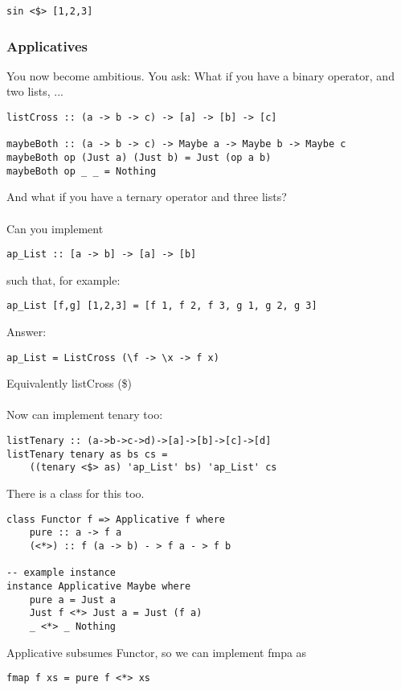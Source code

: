 \documentclass[12pt]{article}
\begin{document}
\begin{lstlisting}
sin <$> [1,2,3]
\end{lstlisting}

\subsubsection{Applicatives}

You now become ambitious. You ask: What if you have a binary operator, and two lists, ...

\begin{lstlisting}
listCross :: (a -> b -> c) -> [a] -> [b] -> [c]

maybeBoth :: (a -> b -> c) -> Maybe a -> Maybe b -> Maybe c
maybeBoth op (Just a) (Just b) = Just (op a b)
maybeBoth op _ _ = Nothing
\end{lstlisting}

And what if you have a ternary operator and three lists?\\
\\
Can you implement
\begin{lstlisting}
ap_List :: [a -> b] -> [a] -> [b]
\end{lstlisting}

such that, for example:

\begin{lstlisting}
ap_List [f,g] [1,2,3] = [f 1, f 2, f 3, g 1, g 2, g 3]
\end{lstlisting}

Answer:
\begin{lstlisting}
ap_List = ListCross (\f -> \x -> f x)
\end{lstlisting}
Equivalently listCross (\$)\\
\\
Now can implement tenary too:

\begin{lstlisting}
listTenary :: (a->b->c->d)->[a]->[b]->[c]->[d]
listTenary tenary as bs cs = 
	((tenary <$> as) 'ap_List' bs) 'ap_List' cs
\end{lstlisting}

There is a class for this too.

\begin{lstlisting}
class Functor f => Applicative f where
	pure :: a -> f a
	(<*>) :: f (a -> b) - > f a - > f b
	
-- example instance
instance Applicative Maybe where
	pure a = Just a
	Just f <*> Just a = Just (f a)
	_ <*> _ Nothing
\end{lstlisting}

Applicative subsumes Functor, so we can implement fmpa as

\begin{lstlisting}
fmap f xs = pure f <*> xs
\end{lstlisting}

\newpage
\end{document}
